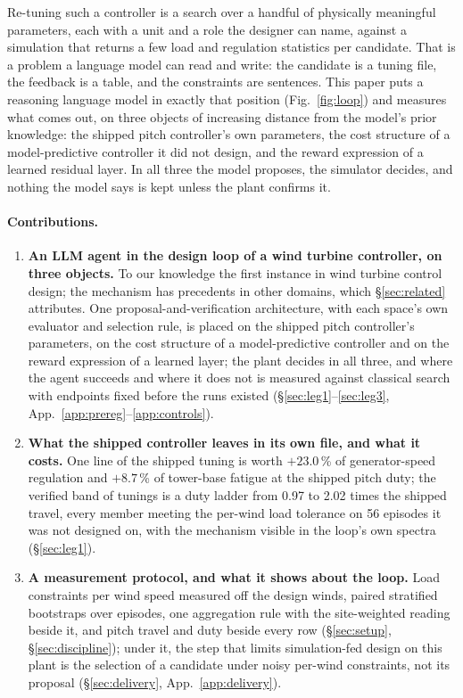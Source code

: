 \documentclass{article}
\begin{document}
Re-tuning such a controller is a search over a handful of physically meaningful parameters, each with a unit and a role the designer can name, against a simulation that returns a few load and regulation statistics per candidate. That is a problem a language model can read and write: the candidate is a tuning file, the feedback is a table, and the constraints are sentences. This paper puts a reasoning language model in exactly that position (Fig.~\ref{fig:loop}) and measures what comes out, on three objects of increasing distance from the model's prior knowledge: the shipped pitch controller's own parameters, the cost structure of a model-predictive controller it did not design, and the reward expression of a learned residual layer. In all three the model proposes, the simulator decides, and nothing the model says is kept unless the plant confirms it.

\paragraph{Contributions.}
\begin{enumerate}
\item \textbf{An LLM agent in the design loop of a wind turbine controller, on three objects.} To our knowledge the first instance in wind turbine control design; the mechanism has precedents in other domains, which §\ref{sec:related} attributes. One proposal-and-verification architecture, with each space's own evaluator and selection rule, is placed on the shipped pitch controller's parameters, on the cost structure of a model-predictive controller and on the reward expression of a learned layer; the plant decides in all three, and where the agent succeeds and where it does not is measured against classical search with endpoints fixed before the runs existed (§\ref{sec:leg1}--\ref{sec:leg3}, App.~\ref{app:prereg}--\ref{app:controls}).
\item \textbf{What the shipped controller leaves in its own file, and what it costs.} One line of the shipped tuning is worth $+23.0$\,\% of generator-speed regulation and $+8.7$\,\% of tower-base fatigue at the shipped pitch duty; the verified band of tunings is a duty ladder from 0.97 to 2.02 times the shipped travel, every member meeting the per-wind load tolerance on 56 episodes it was not designed on, with the mechanism visible in the loop's own spectra (§\ref{sec:leg1}).
\item \textbf{A measurement protocol, and what it shows about the loop.} Load constraints per wind speed measured off the design winds, paired stratified bootstraps over episodes, one aggregation rule with the site-weighted reading beside it, and pitch travel and duty beside every row (§\ref{sec:setup}, §\ref{sec:discipline}); under it, the step that limits simulation-fed design on this plant is the selection of a candidate under noisy per-wind constraints, not its proposal (§\ref{sec:delivery}, App.~\ref{app:delivery}).
\end{enumerate}
\end{document}
